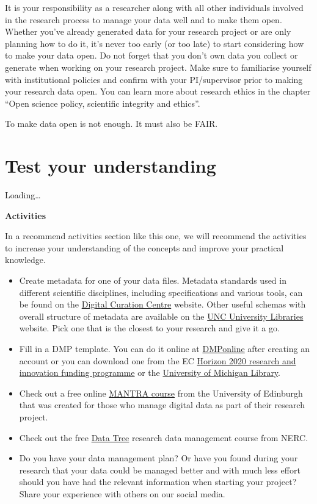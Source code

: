 \documentclass[
]{book}
\begin{document}
It is your responsibility as a researcher along with all other individuals involved in the research process to manage your data well and to make them open. Whether you've already generated data for your research project or are only planning how to do it, it's never too early (or too late) to start considering how to make your data open. Do not forget that you don't own data you collect or generate when working on your research project. Make sure to familiarise yourself with institutional policies and confirm with your PI/supervisor prior to making your research data open. You can learn more about research ethics in the chapter ``Open science policy, scientific integrity and ethics''.

To make data open is not enough. It must also be FAIR.

\hypertarget{test-your-understanding-4}{%
\section{Test your understanding}\label{test-your-understanding-4}}

Loading\ldots{}

\textbf{Activities}

In a recommend activities section like this one, we will recommend the activities to increase your understanding of the concepts and improve your practical knowledge.

\begin{itemize}
\item
  Create metadata for one of your data files. Metadata standards used in different scientific disciplines, including specifications and various tools, can be found on the \href{https://www.dcc.ac.uk/guidance/standards/metadata}{Digital Curation Centre} website. Other useful schemas with overall structure of metadata are available on the \href{https://guides.lib.unc.edu/metadata/standards}{UNC University Libraries} website. Pick one that is the closest to your research and give it a go.
\item
  Fill in a DMP template. You can do it online at \href{https://dmponline.dcc.ac.uk/}{DMPonline} after creating an account or you can download one from the EC \href{https://ec.europa.eu/research/participants/data/ref/h2020/gm/reporting/h2020-tpl-oa-data-mgt-plan_en.docx}{Horizon 2020 research and innovation funding programme} or the \href{https://guides.lib.umich.edu/c.php?g=283277\&p=2138498}{University of Michigan Library}.
\item
  Check out a free online \href{https://mantra.ed.ac.uk/}{MANTRA course} from the University of Edinburgh that was created for those who manage digital data as part of their research project.
\item
  Check out the free \href{https://datatree.org.uk/}{Data Tree} research data management course from NERC.
\item
  Do you have your data management plan? Or have you found during your research that your data could be managed better and with much less effort should you have had the relevant information when starting your project? Share your experience with others on our social media.
\end{itemize}
\end{document}
